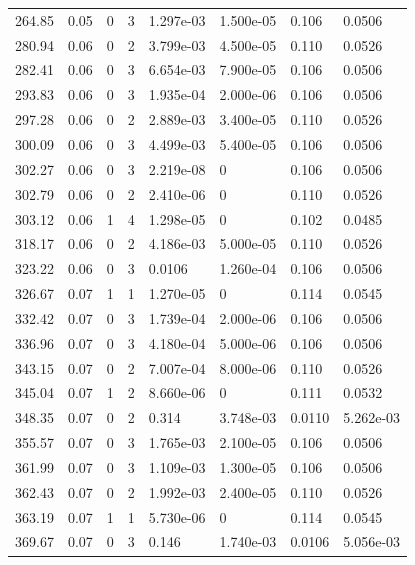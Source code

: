\documentclass[preview]{standalone}
\begin{document}
{{{\begin{tabular}{L{1.2cm}C{1.2cm} C{0.3cm}C{0.5cm} C{1.4cm}C{1.4cm} C{1.4cm}C{1.4cm}}
  264.85  &  0.05  & 0     &  3 &  1.297e-03  & 1.500e-05  & 0.106 &  0.0506   \\ 
  280.94  &  0.06  & 0     &  2 &  3.799e-03  & 4.500e-05  & 0.110 &  0.0526   \\ 
  282.41  &  0.06  & 0     &  3 &  6.654e-03  & 7.900e-05  & 0.106 &  0.0506   \\ 
  293.83  &  0.06  & 0     &  3 &  1.935e-04  & 2.000e-06  & 0.106 &  0.0506   \\ 
  297.28  &  0.06  & 0     &  2 &  2.889e-03  & 3.400e-05  & 0.110 &  0.0526   \\ 
  300.09  &  0.06  & 0     &  3 &  4.499e-03  & 5.400e-05  & 0.106 &  0.0506   \\ 
  302.27  &  0.06  & 0     &  3 &  2.219e-08  & 0  & 0.106 &  0.0506   \\ 
  302.79  &  0.06  & 0     &  2 &  2.410e-06  & 0  & 0.110 &  0.0526   \\ 
  303.12  &  0.06  & 1     &  4 &  1.298e-05  & 0  & 0.102 &  0.0485   \\ 
  318.17  &  0.06  & 0     &  2 &  4.186e-03  & 5.000e-05  & 0.110 &  0.0526   \\ 
  323.22  &  0.06  & 0     &  3 &  0.0106  & 1.260e-04  & 0.106 &  0.0506   \\ 
  326.67  &  0.07  & 1     &  1 &  1.270e-05  & 0  & 0.114 &  0.0545   \\ 
  332.42  &  0.07  & 0     &  3 &  1.739e-04  & 2.000e-06  & 0.106 &  0.0506   \\ 
  336.96  &  0.07  & 0     &  3 &  4.180e-04  & 5.000e-06  & 0.106 &  0.0506   \\ 
  343.15  &  0.07  & 0     &  2 &  7.007e-04  & 8.000e-06  & 0.110 &  0.0526   \\ 
  345.04  &  0.07  & 1     &  2 &  8.660e-06  & 0  & 0.111 &  0.0532   \\ 
  348.35  &  0.07  & 0     &  2 &  0.314  & 3.748e-03  & 0.0110 &  5.262e-03   \\ 
  355.57  &  0.07  & 0     &  3 &  1.765e-03  & 2.100e-05  & 0.106 &  0.0506   \\ 
  361.99  &  0.07  & 0     &  3 &  1.109e-03  & 1.300e-05  & 0.106 &  0.0506   \\ 
  362.43  &  0.07  & 0     &  2 &  1.992e-03  & 2.400e-05  & 0.110 &  0.0526   \\ 
  363.19  &  0.07  & 1     &  1 &  5.730e-06  & 0  & 0.114 &  0.0545   \\ 
  369.67  &  0.07  & 0     &  3 &  0.146  & 1.740e-03  & 0.0106 &  5.056e-03   \\ 

\end{tabular}}}}
\end{document}
